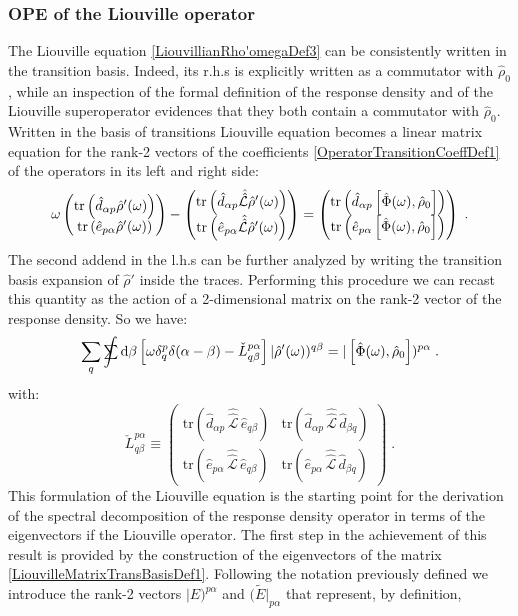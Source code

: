 \documentclass[a4paper]{article}
\newcommand{\dd}{{\rm d}}
\newcommand{\sint}{\mathrlap{\displaystyle\int}
\mathrlap{\textstyle\sum}
\phantom{\mathrlap{\displaystyle
\int}\textstyle\sum}}
\newcommand{\be}{\begin{equation}}
\newcommand{\ee}{\end{equation}}
\newcommand{\nn}{\notag}
\newcommand{\lb}{\label}
\newcommand{\mat}[1]{\begin{pmatrix} #1\end{pmatrix}}
\newcommand{\op}[1]{\hat {#1}}
\newcommand{\sop}[1]{\op{\op {#1}}}
\newcommand{\commutator}[2]{\left[ {#1} , {#2} \right]}
\newcommand{\trace}[1]{\mathrm{tr}\left(#1\right)}
\newcommand{\optr}[1]{\check #1}
\newcommand{\sket}[2]{| #2)^{#1}}
\newcommand{\sbra}[2]{( #2|_{#1}}
\newcommand{\dmnot}{\op{\rho}_0}
\newcommand{\dm}{\op{\rho}}
\newcommand{\excite}[2]{\op e_{{#1}{#2}}}
\newcommand{\decay}[2]{\op d_{{#1}{#2}}}
\newcommand{\Liouv}{\sop{\mathcal L}}
\begin{document}
\subsubsection{OPE of the Liouville operator}

The Liouville equation \eqref{LiouvillianRho'omegaDef3} can be consistently written in the transition basis. Indeed, its r.h.s is explicitly written
as a commutator with $\dmnot$, while an inspection of the formal definition of the response density and of the Liouville superoperator evidences that
they both contain a commutator with $\dmnot$. Written in the basis of transitions Liouville equation becomes a linear matrix equation for the rank-2 
vectors of the coefficients \eqref{OperatorTransitionCoeffDef1} of the operators in its left and right side:
\be
\omega\mat{ \trace{\decay{\alpha}{p}\dm'(\omega)} \\ \trace{\excite{p}{\alpha}\dm'(\omega)}} - 
\mat{ \trace{\decay{\alpha}{p}\Liouv\dm'(\omega)} \\ \trace{\excite{p}{\alpha}\Liouv\dm'(\omega)}} =
\mat{ \trace{\decay{\alpha}{p}\commutator{\op\Phi(\omega)}{\dmnot}} \\ \trace{\excite{p}{\alpha}\commutator{\op\Phi(\omega)}{\dmnot}}}
\;.\nn
\ee
The second addend in the l.h.s can be further analyzed by writing the transition basis expansion of $\dm'$ inside the traces. Performing this procedure
we can recast this quantity as the action of a 2-dimensional matrix on the rank-2 vector of the response density. So we have: 
\be\lb{LiouvilleTransBasisDef1}
\sum_q\sint\dd\beta \left[\omega\delta_q^p\delta(\alpha-\beta)- \optr{L}^{p \alpha}_{q\beta} \right]\sket{q\beta}{\dm'(\omega)} =
\sket{p\alpha}{\commutator{\op\Phi(\omega)}{\dmnot}} \;.
\ee
with:
\be\lb{LiouvilleMatrixTransBasisDef1}
\optr{L}^{p \alpha}_{q\beta} \equiv \mat{\trace{\decay{\alpha}{p}\, \Liouv\, \excite{q}{\beta}} &
\trace{\decay{\alpha}{p}\, \Liouv\, \decay{\beta}{q}} \\
\trace{\excite{p}{\alpha}\, \Liouv\, \excite{q}{\beta}} &
\trace{\excite{p}{\alpha}\, \Liouv\, \decay{\beta}{q}}} \;.
\ee
This formulation of the Liouville equation is the starting point for the derivation of the spectral decomposition of the response density operator
in terms of the eigenvectors if the Liouville operator. 
The first step in the achievement of this result is provided by the construction of the eigenvectors of the matrix \eqref{LiouvilleMatrixTransBasisDef1}.
Following the notation previously defined we introduce the rank-2 vectors $\sket{p\alpha}{E}$ and $\sbra{p\alpha}{\tilde E}$ that represent, by definition,
\end{document}
